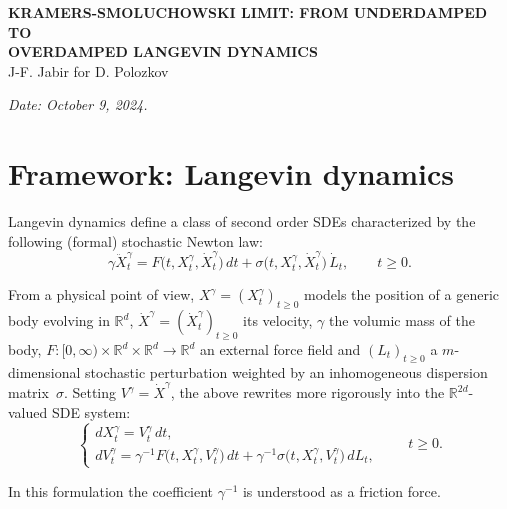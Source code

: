 \documentclass[11pt]{article}
\begin{document}
\begin{center}
{\large\bfseries\MakeUppercase{Kramers-Smoluchowski limit: from underdamped to}}\\
{\large\bfseries\MakeUppercase{overdamped Langevin dynamics}}\\[0.5em]
{\normalsize J-F. Jabir for D. Polozkov}
\end{center}

\noindent\textit{Date: October 9, 2024.}

\section{Framework: Langevin dynamics}

Langevin dynamics define a class of second order SDEs characterized by the following (formal) stochastic Newton law:
\[
\gamma \ddot{X}_t^{\gamma} = F\bigl(t,X_t^{\gamma},\dot{X}_t^{\gamma}\bigr)\,dt + \sigma\bigl(t,X_t^{\gamma},\dot{X}_t^{\gamma}\bigr)\,\dot{L}_t,
\qquad t \ge 0.
\]

From a physical point of view, $X^{\gamma}=(X_t^{\gamma})_{t\ge0}$ models the position of a generic body evolving in $\mathbb{R}^d$,
$\dot{X}^{\gamma}=(\dot{X}_t^{\gamma})_{t\ge0}$ its velocity, $\gamma$ the volumic mass of the body,
$F:[0,\infty)\times\mathbb{R}^d\times\mathbb{R}^d\to\mathbb{R}^d$ an external force field
and $(L_t)_{t\ge0}$ a $m$-dimensional stochastic perturbation weighted by an inhomogeneous dispersion matrix~$\sigma$.
Setting $V^{\gamma}=\dot{X}^{\gamma}$, the above rewrites more rigorously into the $\mathbb{R}^{2d}$-valued SDE system:
\begin{equation}
\label{eq:1.1}
\begin{cases}
dX_t^{\gamma} = V_t^{\gamma}\,dt,\\
dV_t^{\gamma} = \gamma^{-1}F\bigl(t,X_t^{\gamma},V_t^{\gamma}\bigr)\,dt + \gamma^{-1}\sigma\bigl(t,X_t^{\gamma},V_t^{\gamma}\bigr)\,dL_t,
\end{cases}
\qquad t\ge0.
\end{equation}

In this formulation the coefficient $\gamma^{-1}$ is understood as a friction force.
\end{document}
